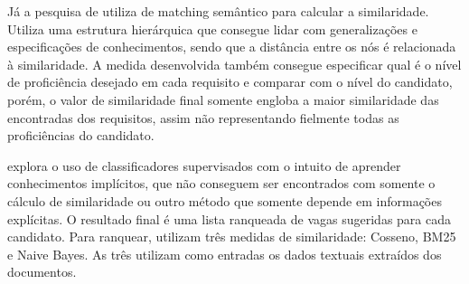 \documentclass[preprint,12pt]{elsarticle}
\begin{document}







Já a pesquisa de \cite{impact-semantic-web-2005} utiliza de matching semântico para calcular a similaridade. Utiliza uma estrutura hierárquica que consegue lidar com generalizações e especificações de conhecimentos, sendo que a distância entre os nós é relacionada à similaridade. A medida desenvolvida também consegue especificar qual é o nível de proficiência desejado em cada requisito e comparar com o nível do candidato, porém, o valor de similaridade final somente engloba a maior similaridade das encontradas dos requisitos, assim não representando fielmente todas as proficiências do candidato. 

\cite{poch-etal-2014-ranking} explora o uso de classificadores supervisados com o intuito de aprender conhecimentos implícitos, que não conseguem ser encontrados com somente o cálculo de similaridade ou outro método que somente depende em informações explícitas. O resultado final é uma lista ranqueada de vagas sugeridas para cada candidato. Para ranquear, utilizam três medidas de similaridade: Cosseno, BM25 e Naive Bayes. As três utilizam como entradas os dados textuais extraídos dos documentos.
\end{document}

